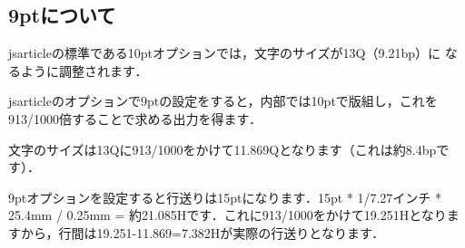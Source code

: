 \documentclass[a4j, 12Q, twocolumn, twoside, draft]{jsarticle}
\begin{document}
\subsection{9ptについて}
jsarticleの標準である10ptオプションでは，文字のサイズが13Q（9.21bp）に
なるように調整されます．

jsarticleのオプションで9ptの設定をすると，内部では10ptで版組し，これを
913/1000倍することで求める出力を得ます．

文字のサイズは13Qに913/1000をかけて11.869Qとなります（これは約8.4bpです）．

9ptオプションを設定すると行送りは15ptになります．15pt * 1/7.27インチ *
25.4mm / 0.25mm = 約21.085Hです．これに913/1000をかけて19.251Hとなりま
すから，行間は19.251-11.869=7.382Hが実際の行送りとなります．


\end{document}
